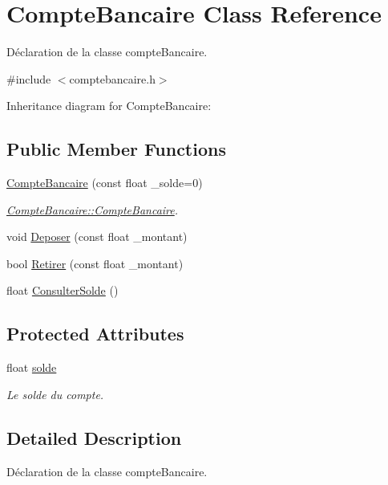 \hypertarget{class_compte_bancaire}{}\section{Compte\+Bancaire Class Reference}
\label{class_compte_bancaire}


Déclaration de la classe compte\+Bancaire.  




{\ttfamily \#include $<$comptebancaire.\+h$>$}



Inheritance diagram for Compte\+Bancaire\+:
\subsection*{Public Member Functions}
\begin{DoxyCompactItemize}
\item 
\hyperlink{class_compte_bancaire_adfdd7a467ec100c22b395d74d1a5509d}{Compte\+Bancaire} (const float \+\_\+solde=0)
\begin{DoxyCompactList}\small\item\em \hyperlink{class_compte_bancaire_adfdd7a467ec100c22b395d74d1a5509d}{Compte\+Bancaire\+::\+Compte\+Bancaire}. \end{DoxyCompactList}\item 
void \hyperlink{class_compte_bancaire_a3e55bd1ec0622a9243a30a13e89266e1}{Deposer} (const float \+\_\+montant)
\item 
bool \hyperlink{class_compte_bancaire_a9c313460924e7f125d39a34364eb7fa6}{Retirer} (const float \+\_\+montant)
\item 
float \hyperlink{class_compte_bancaire_a5caabd51cbde1a2ec3bedbf12db1c869}{Consulter\+Solde} ()
\end{DoxyCompactItemize}
\subsection*{Protected Attributes}
\begin{DoxyCompactItemize}
\item 
float \hyperlink{class_compte_bancaire_a225c767a08a5e114bbf111509c4f4c94}{solde}
\begin{DoxyCompactList}\small\item\em Le solde du compte. \end{DoxyCompactList}\end{DoxyCompactItemize}


\subsection{Detailed Description}
Déclaration de la classe compte\+Bancaire. 

